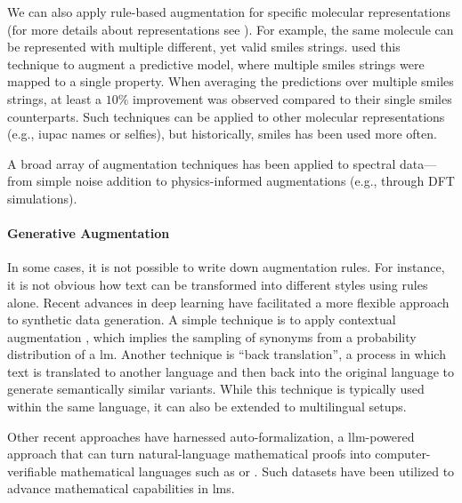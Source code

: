 We can also apply rule-based augmentation for specific molecular representations (for more details about representations see ). 
For example, the same molecule can be represented with multiple different, yet valid \gls{smiles} strings. 
\textcite{bjerrum2017smiles} used this technique to augment a predictive model, where multiple \gls{smiles} strings were mapped to a single property. 
When averaging the predictions over multiple \gls{smiles} strings, at least a $10\%$ improvement was observed compared to their single \gls{smiles} counterparts. 
Such techniques can be applied to other molecular representations (e.g., \gls{iupac} names or \gls{selfies}), but historically, \gls{smiles} has been used more often.\autocite{kimber2021maxsmi,born2023chemical,arus2019randomized,Tetko_Karpov_VanDeursen_Godin_2020}

A broad array of augmentation techniques has been applied to spectral data---from simple noise addition\autocite{ke2018convolutional,moreno2022application} to physics-informed augmentations (e.g., through DFT simulations).\autocite{oviedo2019fast,gao2020general}

\paragraph{Generative Augmentation}
In some cases, it is not possible to write down augmentation rules. 
For instance, it is not obvious how text can be transformed into different styles using rules alone.
Recent advances in deep learning have facilitated a more flexible approach to synthetic data generation. \autocite{maini2024rephrasing} 
A simple technique is to apply contextual augmentation \autocite{kobayashi2018contextual}, which implies the sampling of synonyms from a probability distribution of a \gls{lm}. 
Another technique is \enquote{back translation},\autocite{edunov2018understanding} a process in which text is translated to another language and then back into the original language to generate semantically similar variants. 
While this technique is typically used within the same language,\autocite{lu2024mathgenie0} it can also be extended to multilingual setups\autocite{hong2024cantonmt0}.
 
Other recent approaches have harnessed auto-formalization\autocite{NEURIPS2022_d0c6bc64}, a \gls{llm}-powered approach that can turn natural-language mathematical proofs into computer-verifiable mathematical languages such as \autocite{de2015lean} or \autocite{wenzel2008isabelle}. 
Such datasets have been utilized to advance mathematical capabilities in \glspl{lm}.\autocite{xin2024deepseek,trinh2024solving}

